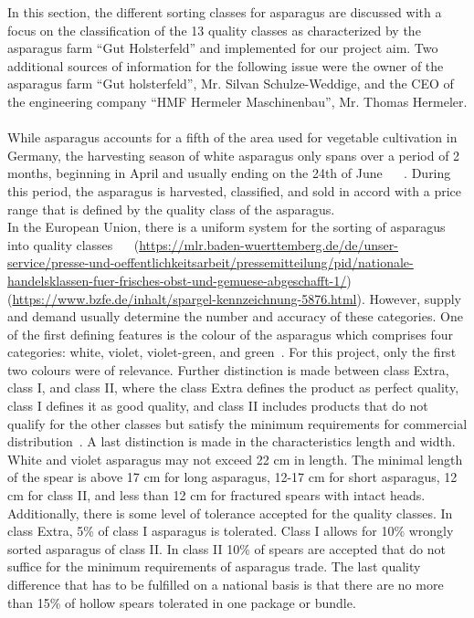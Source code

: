 In this section, the different sorting classes for asparagus are discussed with a focus on the classification of the 13 quality classes as characterized by the asparagus farm “Gut Holsterfeld” and implemented for our project aim. Two additional sources of information for the following issue were the owner of the asparagus farm “Gut holsterfeld”, Mr. Silvan Schulze-Weddige, and the CEO of the engineering company “HMF Hermeler Maschinenbau”, Mr. Thomas Hermeler. \\
\\
While asparagus accounts for a fifth of the area used for vegetable cultivation in Germany, the harvesting season of white asparagus only spans over a period of 2 months, beginning in April and usually ending on the 24th of June ~\citep{spargelstatistik} ~\citep{nrw2018spargel}. During this period, the asparagus is harvested, classified, and sold in accord with a price range that is defined by the quality class of the asparagus. \\
In the European Union, there is a uniform system for the sorting of asparagus into quality classes~\citep{euspargelnorm} ~\citep{unspargelnorm} (\url{https://mlr.baden-wuerttemberg.de/de/unser-service/presse-und-oeffentlichkeitsarbeit/pressemitteilung/pid/nationale-handelsklassen-fuer-frisches-obst-und-gemuese-abgeschafft-1/})(\url{https://www.bzfe.de/inhalt/spargel-kennzeichnung-5876.html}). However, supply and demand usually determine the number and accuracy of these categories. One of the first defining features is the colour of the asparagus which comprises four categories: white, violet, violet-green, and green~\citep{euspargelnorm}. For this project, only the first two colours were of relevance. Further distinction is made between class Extra, class I, and class II, where the class Extra defines the product as perfect quality, class I defines it as good quality, and class II includes products that do not qualify for the other classes but satisfy the minimum requirements for commercial distribution~\citep{euspargelnorm}. A last distinction is made in the characteristics length and width. White and violet asparagus may not exceed 22 cm in length. The minimal length of the spear is above 17 cm for long asparagus, 12-17 cm for short asparagus, 12 cm for class II, and less than 12 cm for fractured spears with intact heads. Additionally, there is some level of tolerance accepted for the quality classes. In class Extra, 5\% of class I asparagus is tolerated. Class I allows for 10\% wrongly sorted asparagus of class II. In class II 10\% of spears are accepted that do not suffice for the minimum requirements of asparagus trade. The last quality difference that has to be fulfilled on a national basis is that there are no more than 15\% of hollow spears tolerated in one package or bundle. \\

